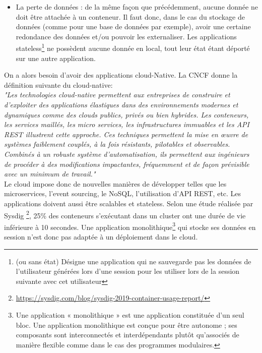 \documentclass[11pt,fleqn]{book} %
\begin{document}
\begin{itemize}
    \item La perte de données : de la même façon que précédemment, aucune donnée ne doit être attachée à un conteneur. Il faut donc, dans le cas du stockage de données (comme pour une base de données par exemple), avoir une certaine redondance des données et/ou pouvoir les externaliser. Les applications stateless\footnote{(ou sans état) Désigne une application qui ne sauvegarde pas les données de l'utilisateur générées lors d'une session pour les utiliser lors de la session suivante avec cet utilisateur} ne possèdent aucune donnée en local, tout leur état étant déporté sur une autre application.\\
\end{itemize}

On a alors besoin d'avoir des applications cloud-Native. La CNCF donne la définition suivante du cloud-native: \\

\textit{"Les technologies cloud-native permettent aux entreprises de construire et d'exploiter des applications élastiques dans des environnements modernes et dynamiques comme des clouds publics, privés ou bien hybrides. Les conteneurs, les services maillés, les micro services, les infrastructures immuables et les API REST illustrent cette approche. Ces techniques permettent la mise en œuvre de systèmes faiblement couplés, à la fois résistants, pilotables et observables. Combinés à un robuste système d'automatisation, ils permettent aux ingénieurs de procéder à des modifications impactantes, fréquemment et de façon prévisible avec un minimum de travail."} \\

Le cloud impose donc de nouvelles manières de développer telles que les microservices, l'event sourcing, le NoSQL, l'utilisation d'API REST, etc. Les applications doivent aussi être scalables et stateless. Selon une étude réalisée par Sysdig \footnote{\url{https://sysdig.com/blog/sysdig-2019-container-usage-report/}}, 25\% des conteneurs s'exécutant dans un cluster ont une durée de vie inférieure à 10 secondes. Une application monolithique\footnote{Une application « monolithique » est une application constituée d'un seul bloc. Une application monolithique est conçue pour être autonome ; ses composants sont interconnectés et interdépendants plutôt qu'associés de manière flexible comme dans le cas des programmes modulaires.} qui stocke ses données en session n'est donc pas adaptée à un déploiement dans le cloud.\\
\end{document}
